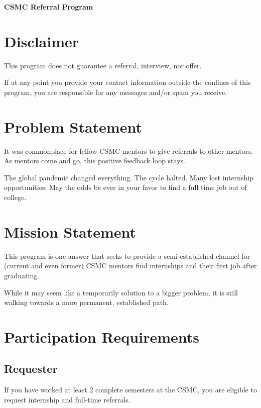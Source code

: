 \documentclass[letterpaper, 12pt]{article}
\newcommand{\minCompleteFullTimeRequirementSemesters}{2}
\begin{document}
\begin{center}
    \bfseries\Large CSMC Referral Program
\end{center}

\section{Disclaimer}\label{section:disclaimer}

This program does not guarantee a referral, interview, nor offer.

If at any point you provide your contact information outside the confines of
this program, you are responsible for any messages and/or spam you
receive.\label{section:disclaimer:spamMessages}

\section{Problem Statement}

It was commonplace for fellow CSMC mentors to give referrals to other mentors.
As mentors come and go, this positive feedback loop stays.

The global pandemic changed everything. The cycle halted. Many lost internship
opportunities. May the odds be ever in your favor to find a full time job out of
college.

\section{Mission Statement}

This program is one answer that seeks to provide a semi-established channel for
(current and even former) CSMC mentors find internships and their first job after
graduating.

While it may seem like a temporarily solution to a bigger problem, it is still
walking towards a more permanent, established path.

\section{Participation Requirements}

\subsection{Requester}

If you have worked at least \minCompleteFullTimeRequirementSemesters{} complete
semesters at the CSMC, you are eligible to request internship and full-time
referrals.
\end{document}
